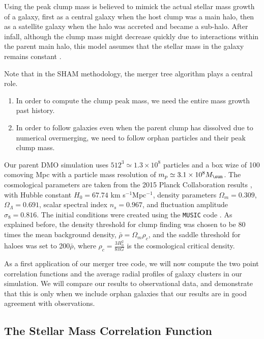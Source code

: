 Using the  peak clump mass  is believed  to mimick the  actual stellar
mass growth of a galaxy, first as a central galaxy when the host clump
was a main halo, then as a satellite galaxy when the halo was accreted
and became  a sub-halo.  After  infall, although the clump  mass might
decrease quickly due to interactions within the parent main halo, this
model assumes  that the  stellar mass in  the galaxy  remains constant
\citep{Nagai}.

Note that in  the SHAM methodology, the merger tree  algorithm plays a
central role.
\begin{enumerate}
\item In order to compute the clump peak mass, we need the entire mass
  growth past history.
\item  In order  to follow  galaxies even  when the  parent clump  has
  dissolved due  to numerical  overmerging, we  need to  follow orphan
  particles and their peak clump mass.
\end{enumerate}

Our parent DMO simulation uses $512^3 \simeq 1.3\times 10^8$ particles
and a box wize of 100 comoving  Mpc with a particle mass resolution of
$m_p \simeq  3.1 \times  10^8\msol$.  The cosmological  parameters are
taken from  the 2015 Planck Collaboration  results \citep{Planck2015},
with  Hubble constant  $H_0  = 67.74$  km s$^{-1}$Mpc$^{-1}$,  density
parameters  $\Omega_m  =  0.309$,  $\Omega_\Lambda  =  0.691$,  scalar
spectral index  $n_s = 0.967$,  and fluctuation amplitude  $\sigma_8 =
0.816$.  The initial conditions  were created using the \texttt{MUSIC}
code \citep{MUSIC}.   As explained  before, the density  threshold for
clump finding was  chosen to be 80 times the  mean background density,
$\bar{\rho} =  \Omega_m \rho_c$, and  the saddle threshold  for haloes
was set to  200$\bar{\rho}$, where $\rho_c = \frac{3  H_0^2}{8 \pi G}$
is the cosmological critical density.

As a  first application of our  merger tree code, we  will now compute
the two point correlation functions and the average radial profiles of
galaxy  clusters in  our simulation.  We will  compare our  results to
observational data, and demonstrate that  this is only when we include
orphan  galaxies  that   our  results  are  in   good  agreement  with
observations.

\subsection{The Stellar Mass Correlation Function}\label{chap:correlation}

